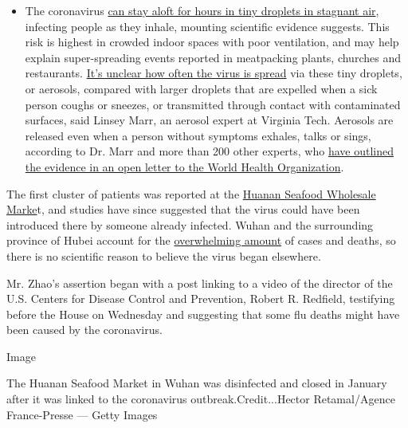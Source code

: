 \begin{itemize}
  \begin{itemize}
  \tightlist
  \item
    The coronavirus
    \href{https://www.nytimes3xbfgragh.onion/2020/07/04/health/239-experts-with-one-big-claim-the-coronavirus-is-airborne.html?action=click\&pgtype=Article\&state=default\&region=MAIN_CONTENT_3\&context=storylines_faq}{can
    stay aloft for hours in tiny droplets in stagnant air}, infecting
    people as they inhale, mounting scientific evidence suggests. This
    risk is highest in crowded indoor spaces with poor ventilation, and
    may help explain super-spreading events reported in meatpacking
    plants, churches and restaurants.
    \href{https://www.nytimes3xbfgragh.onion/2020/07/06/health/coronavirus-airborne-aerosols.html?action=click\&pgtype=Article\&state=default\&region=MAIN_CONTENT_3\&context=storylines_faq}{It's
    unclear how often the virus is spread} via these tiny droplets, or
    aerosols, compared with larger droplets that are expelled when a
    sick person coughs or sneezes, or transmitted through contact with
    contaminated surfaces, said Linsey Marr, an aerosol expert at
    Virginia Tech. Aerosols are released even when a person without
    symptoms exhales, talks or sings, according to Dr. Marr and more
    than 200 other experts, who
    \href{https://academic.oup.com/cid/article/doi/10.1093/cid/ciaa939/5867798}{have
    outlined the evidence in an open letter to the World Health
    Organization}.
  \end{itemize}
\end{itemize}

The first cluster of patients was reported at the
\href{https://www.nytimes3xbfgragh.onion/2020/01/25/world/asia/china-markets-coronavirus-sars.html}{Huanan
Seafood Wholesale Marke}t, and studies have since suggested that the
virus could have been introduced there by someone already infected.
Wuhan and the surrounding province of Hubei account for the
\href{https://www.nytimes3xbfgragh.onion/interactive/2020/world/coronavirus-maps.html}{overwhelming
amount} of cases and deaths, so there is no scientific reason to believe
the virus began elsewhere.

Mr. Zhao's assertion began with a post linking to a video of the
director of the U.S. Centers for Disease Control and Prevention, Robert
R. Redfield, testifying before the House on Wednesday and suggesting
that some flu deaths might have been caused by the coronavirus.

Image

The Huanan Seafood Market in Wuhan was disinfected and closed in January
after it was linked to the coronavirus outbreak.Credit...Hector
Retamal/Agence France-Presse --- Getty Images


